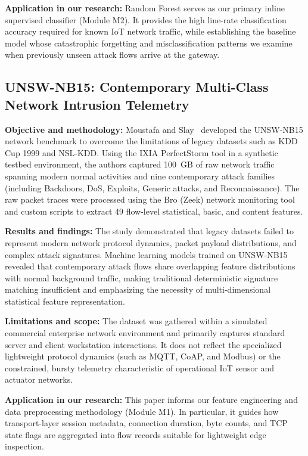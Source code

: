 \smallskip
\noindent\textbf{Application in our research:} Random Forest serves as our primary inline supervised classifier (Module M2). It provides the high line-rate classification accuracy required for known IoT network traffic, while establishing the baseline model whose catastrophic forgetting and misclassification patterns we examine when previously unseen attack flows arrive at the gateway.

\subsection{UNSW-NB15: Contemporary Multi-Class Network Intrusion Telemetry}

\noindent\textbf{Objective and methodology:} Moustafa and Slay~\cite{moustafa2015unsw} developed the UNSW-NB15 network benchmark to overcome the limitations of legacy datasets such as KDD Cup 1999 and NSL-KDD. Using the IXIA PerfectStorm tool in a synthetic testbed environment, the authors captured 100~GB of raw network traffic spanning modern normal activities and nine contemporary attack families (including Backdoors, DoS, Exploits, Generic attacks, and Reconnaissance). The raw packet traces were processed using the Bro (Zeek) network monitoring tool and custom scripts to extract 49 flow-level statistical, basic, and content features.

\smallskip
\noindent\textbf{Results and findings:} The study demonstrated that legacy datasets failed to represent modern network protocol dynamics, packet payload distributions, and complex attack signatures. Machine learning models trained on UNSW-NB15 revealed that contemporary attack flows share overlapping feature distributions with normal background traffic, making traditional deterministic signature matching insufficient and emphasizing the necessity of multi-dimensional statistical feature representation.

\smallskip
\noindent\textbf{Limitations and scope:} The dataset was gathered within a simulated commercial enterprise network environment and primarily captures standard server and client workstation interactions. It does not reflect the specialized lightweight protocol dynamics (such as MQTT, CoAP, and Modbus) or the constrained, bursty telemetry characteristic of operational IoT sensor and actuator networks.

\smallskip
\noindent\textbf{Application in our research:} This paper informs our feature engineering and data preprocessing methodology (Module M1). In particular, it guides how transport-layer session metadata, connection duration, byte counts, and TCP state flags are aggregated into flow records suitable for lightweight edge inspection.

